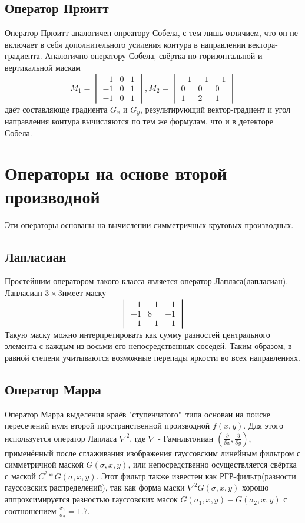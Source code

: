 \documentclass[a4paper,12pt]{report}
\begin{document}
\subsection{Оператор Прюитт}
Оператор Прюитт аналогичен опреатору Собела, с тем лишь отличием, что он не включает в себя дополнительного усиления контура в направлении вектора-градиента. Аналогично оператору Собела, свёртка по горизонтальной и вертикальной маскам
\begin{equation}
M_1=\begin{vmatrix}-1 & 0 & 1 \\
-1 & 0 & 1\\
-1 & 0 & 1\end{vmatrix}, M_2=\begin{vmatrix}-1& -1 & -1 \\
0 & 0 & 0\\
1 & 2 & 1\end{vmatrix}
\end{equation}
даёт составляюще градиента $G_x$ и $G_y$, результирующий вектор-градиент и угол направления контура вычисляются по тем же формулам, что и в детекторе Собела.

\section{Операторы на основе второй производной}
Эти операторы основаны на вычислении симметричных круговых производных.
\subsection{Лапласиан}
Простейшим оператором такого класса является оператор Лапласа(лапласиан). Лапласиан $3\times 3$имеет маску
\begin{equation}
\begin{vmatrix}-1 & -1 & -1\\
-1 & 8 & -1\\
-1 & -1 & -1\end{vmatrix}
\end{equation}
Такую маску можно интерпретировать как сумму разностей центрального элемента с каждым из восьми его непосредственных соседей. Таким образом, в равной степени учитываются возможные перепады яркости во всех направлениях.
\subsection{Оператор Марра}

Оператор Марра выделения краёв "ступенчатого"\ типа основан на поиске пересечений нуля второй пространственной производной $f(x,y)$. Для этого используется оператор Лапласа $\nabla^2$, где $\nabla$ - Гамильтониан $(\frac{\partial}{\partial x},\frac{\partial}{\partial y})$, применённый после сглаживания изображения гауссовским линейным фильтром с симметричной маской $G(\sigma,x,y)$, или непосредственно осуществляется свёртка с маской $C^2\ast G(\sigma,x,y)$. Этот фильтр также известен как РГР-фильтр(разности гауссовских распределений), так как форма маски $\nabla^2 G(\sigma,x,y)$ хорошо аппроксимируется разностью гауссовских масок  $G(\sigma_1,x,y)-G(\sigma_2,x,y)$ с соотношением $\frac{\sigma_1}{\sigma_2}=1.7$.
\end{document}
